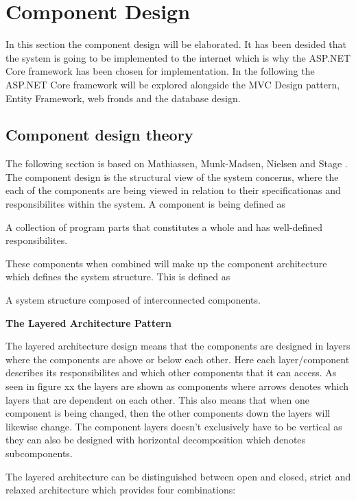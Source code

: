 \section{Component Design}

In this section the component design will be elaborated.
It has been desided that the system is going to be implemented to the internet which is why the ASP.NET Core framework has been chosen for implementation.
In the following the ASP.NET Core framework will be explored alongside the MVC Design pattern, Entity Framework, web fronds and the database design.

\subsection{Component design theory}

The following section is based on Mathiassen, Munk-Madsen, Nielsen and Stage \cite{Rod-Aalborg}.
The component design is the structural view of the system concerns, where the each of the components are being viewed in relation to their specificationas and responsibilites within the system.
A component is being defined as
\begin{defn}
	A collection of program parts that constitutes a whole and has well-defined responsibilites. \citep[p.~192]{Rod-Aalborg}
\end{defn}
These components when combined will make up the component architecture which defines the system structure.
This is defined as
\begin{defn}
	A system structure composed of interconnected components. \citep[p.~192]{Rod-Aalborg}
\end{defn}

\textbf{The Layered Architecture Pattern}

The layered architecture design means that the components are designed in layers where the components are above or below each other.
Here each layer/component describes its responsibilites and which other components that it can access.
As seen in figure xx the layers are shown as components where arrows denotes which layers that are dependent on each other.
This also means that when one component is being changed, then the other components down the layers will likewise change.
The component layers doesn't exclusively have to be vertical as they can also be designed with horizontal decomposition which denotes subcomponents.

The layered architecture can be distinguished between open and closed, strict and relaxed architecture which provides four combinations:

